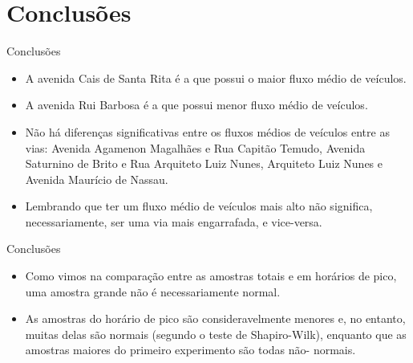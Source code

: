 \section{Conclusões}

\begin{frame}{Conclusões}
	\begin{itemize}
		\item A avenida Cais de Santa Rita é a que possui o maior fluxo médio de
		veículos.
		\item A avenida Rui Barbosa é a que possui menor fluxo médio de
		veículos.
		\item Não há diferenças significativas entre os fluxos médios de
		veículos entre as vias: Avenida Agamenon Magalhães e Rua Capitão Temudo,
		Avenida Saturnino de Brito e Rua Arquiteto Luiz Nunes, Arquiteto Luiz
		Nunes e Avenida Maurício de Nassau.
		\item Lembrando que ter um fluxo médio de veículos mais alto não
		significa, necessariamente, ser uma via mais engarrafada, e vice-versa.
	\end{itemize}
\end{frame}

\begin{frame}{Conclusões}
	\begin{itemize}
		\item Como vimos na comparação entre as amostras totais e em horários de
		pico, uma amostra grande não é necessariamente normal.
		\item As amostras do horário de pico são consideravelmente menores e, no
		entanto, muitas delas são normais (segundo o teste de Shapiro-Wilk),
		enquanto que as amostras maiores do primeiro experimento são todas não-
		normais.
	\end{itemize}
\end{frame}
